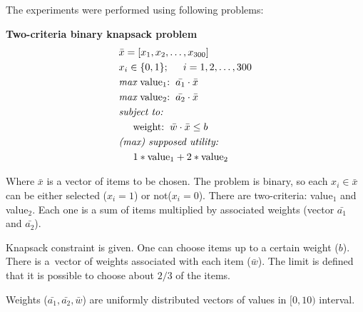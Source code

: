 The experiments were performed using following problems:
\begin{description}
  \item{\textbf{Two-criteria binary knapsack problem}}
    \begin{align*}
      & \bar{x} = [x_1, x_2, \dots, x_{300}]  \\
      & x_i \in \{0, 1\};  \hspace{0.5cm} i = 1, 2, \dots, 300 \\
      & \textit{max}\text{ value$_1$:} \hspace{0.2cm} \bar{a_1} \cdot \bar{x} \\
      & \textit{max}\text{ value$_2$:} \hspace{0.2cm} \bar{a_2} \cdot \bar{x} \\
      & \textit{subject to:} \\
      & \hspace{0.5cm} \text{weight:} \hspace{0.2cm} \bar{w} \cdot \bar{x}
      \leq b \\
      & \textit{(max) supposed utility:} \\
      & \hspace{0.5cm} 1*\text{value}_1 + 2*\text{value}_2
    \end{align*}
    
    Where $\bar{x}$ is a vector of items to be chosen. The problem is binary,
    so each $x_i \in \bar{x}$ can be either selected ($x_i = 1$) or not($x_i
    = 0$). There are two-criteria: value$_1$ and value$_2$. Each one is a sum
    of items multiplied by associated weights (vector $\bar{a_1}$ and
    $\bar{a_2}$).

    Knapsack constraint is given. One can choose items up to a certain weight
    ($b$). There is a~vector of weights associated with each item
    ($\bar{w}$). The limit is defined that it is possible to choose about
    $2/3$ of the items.

    Weights ($\bar{a_1}, \bar{a_2}, \bar{w}$) are uniformly distributed
    vectors of values in $[0,10)$ interval.



\end{description}
